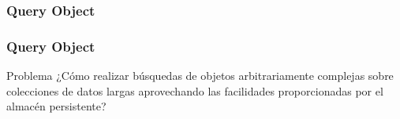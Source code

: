 \documentclass[a4paper,slidestop,xcolor=pst,dvips,blue]{beamer}
\begin{document}
\subsubsection{Query Object}

\begin{frame}[c]
    \frametitle{Query Object}
    \begin{block}{Problema}
        ¿Cómo realizar búsquedas de objetos arbitrariamente complejas sobre colecciones de datos largas aprovechando las facilidades proporcionadas por el almacén persistente?
    \end{block}
\end{frame}



%

%
%	
%    
\end{document}

